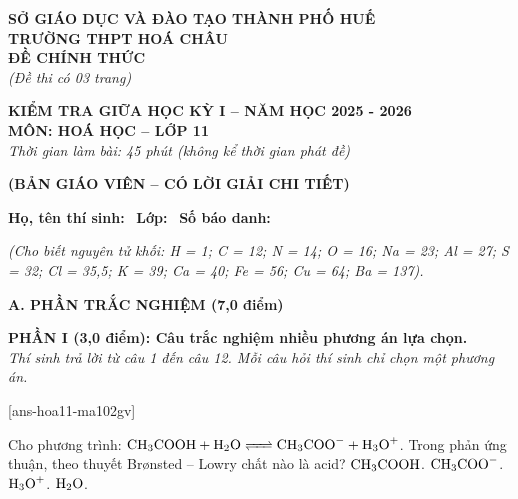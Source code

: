 \documentclass[12pt,a4paper]{article}
\begin{document}
\thispagestyle{firstpage}

\noindent
\begin{minipage}[t]{0.45\textwidth}
	\centering\fontsize{10pt}{12pt}\selectfont
	\textbf{SỞ GIÁO DỤC VÀ ĐÀO TẠO THÀNH PHỐ HUẾ}\\
	\textbf{TRƯỜNG THPT HOÁ CHÂU}\\
	\textbf{ĐỀ CHÍNH THỨC}\\
	\textit{(Đề thi có 03 trang)}
\end{minipage}\hfill
\begin{minipage}[t]{0.53\textwidth}
	\centering\small
	\textbf{KIỂM TRA GIỮA HỌC KỲ I -- NĂM HỌC 2025 - 2026}\\
	\textbf{MÔN: HOÁ HỌC -- LỚP 11}\\
	\textit{Thời gian làm bài: 45 phút (không kể thời gian phát đề)}\\
\end{minipage}

\smallskip
\begin{center}
	{\color{hfRed}\textbf{\large (BẢN GIÁO VIÊN -- CÓ LỜI GIẢI CHI TIẾT)}}
\end{center}

\smallskip
\noindent\hrulefill
\smallskip

\noindent\textbf{Họ, tên thí sinh:} \dotfill\ \textbf{Lớp:} \dotfill\ \textbf{Số báo danh:} \dotfill

\smallskip
\noindent\textit{(Cho biết nguyên tử khối: H = 1; C = 12; N = 14; O = 16; Na = 23; Al = 27; S = 32; Cl = 35,5; K = 39; Ca = 40; Fe = 56; Cu = 64; Ba = 137).}
\smallskip

\noindent
\textbf{\large A. PHẦN TRẮC NGHIỆM (7,0 điểm)}

\smallskip
\noindent
\textbf{PHẦN I (3,0 điểm): Câu trắc nghiệm nhiều phương án lựa chọn.}\\
\textit{Thí sinh trả lời từ câu 1 đến câu 12. Mỗi câu hỏi thí sinh chỉ chọn một phương án.}

[ans-hoa11-ma102gv]

\begin{ex}
Cho phương trình: $\ce{CH3COOH + H2O <=> CH3COO- + H3O+}$. Trong phản ứng thuận, theo thuyết Brønsted -- Lowry chất nào là acid?
\choice
{\True $\ce{CH3COOH}$.}
{$\ce{CH3COO-}$.}
{$\ce{H3O+}$.}
{$\ce{H2O}$.}
\end{ex}
\end{document}
